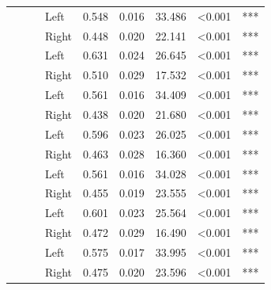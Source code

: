 \begin{longtable}[t]{>{\raggedright\arraybackslash}t{4cm}>{\raggedright\arraybackslash}t{4cm}>{\raggedright\arraybackslash}t{2.5cm}lrrrll}
\nopagebreak
 &  &  & Left & 0.548 & 0.016 & 33.486 & <0.001 & ***\\
\nopagebreak
 &  &  & Right & 0.448 & 0.020 & 22.141 & <0.001 & ***\\
\nopagebreak
 &  &  & Left & 0.631 & 0.024 & 26.645 & <0.001 & ***\\
\nopagebreak
 &  &  & Right & 0.510 & 0.029 & 17.532 & <0.001 & ***\\
\nopagebreak
 &  &  & Left & 0.561 & 0.016 & 34.409 & <0.001 & ***\\
\nopagebreak
 &  &  & Right & 0.438 & 0.020 & 21.680 & <0.001 & ***\\
\nopagebreak
 &  &  & Left & 0.596 & 0.023 & 26.025 & <0.001 & ***\\
\nopagebreak
 &  &  & Right & 0.463 & 0.028 & 16.360 & <0.001 & ***\\
\nopagebreak
 &  &  & Left & 0.561 & 0.016 & 34.028 & <0.001 & ***\\
\nopagebreak
 &  &  & Right & 0.455 & 0.019 & 23.555 & <0.001 & ***\\
\nopagebreak
 &  &  & Left & 0.601 & 0.023 & 25.564 & <0.001 & ***\\
\nopagebreak
 &  &  & Right & 0.472 & 0.029 & 16.490 & <0.001 & ***\\
\nopagebreak
 &  &  & Left & 0.575 & 0.017 & 33.995 & <0.001 & ***\\
\nopagebreak
{} &  &  & Right & 0.475 & 0.020 & 23.596 & <0.001 & ***\\
\bottomrule
\end{longtable}
